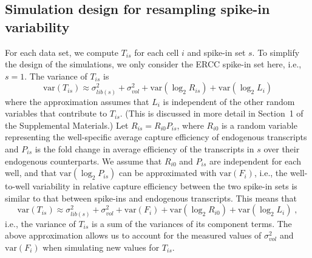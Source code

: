 \documentclass{article}
\newcommand{\suppsecmath}{1}
\newcommand\variance{\mbox{var}}
\begin{document}
\subsection*{Simulation design for resampling spike-in variability}
For each data set, we compute $T_{is}$ for each cell $i$ and spike-in set $s$.
To simplify the design of the simulations, we only consider the ERCC spike-in set here, i.e., $s=1$.
The variance of $T_{is}$ is
\[
    \variance(T_{is}) \approx \sigma^2_{lib(s)} + \sigma^2_{vol} + \variance(\log_2 R_{is}) + \variance(\log_2 L_i)
\]
where the approximation assumes that $L_i$ is independent of the other random variables that contribute to $T_{is}$.
(This is discussed in more detail in Section~\suppsecmath{} of the Supplemental Materials.)
Let $R_{is} = R_{i0}P_{is}$, where $R_{i0}$ is a random variable representing the well-specific average capture efficiency of endogenous transcripts and $P_{is}$ is the fold change in average efficiency of the transcripts in $s$ over their endogenous counterparts.
We assume that $R_{i0}$ and $P_{is}$ are independent for each well, and that $\variance(\log_2 P_{is})$ can be approximated with $\variance(F_i)$,
i.e., the well-to-well variability in relative capture efficiency between the two spike-in sets is similar to that between spike-ins and endogenous transcripts.
This means that
\[
    \variance(T_{is}) \approx \sigma^2_{lib(s)} + \sigma^2_{vol} + \variance(F_i) + \variance(\log_2 R_{i0}) + \variance(\log_2 L_i) \;,
\]
i.e., the variance of $T_{is}$ is a sum of the variances of its component terms.
The above approximation allows us to account for the measured values of $ \sigma^2_{vol}$ and $\variance(F_i)$ when simulating new values for $T_{is}$.

\end{document}
